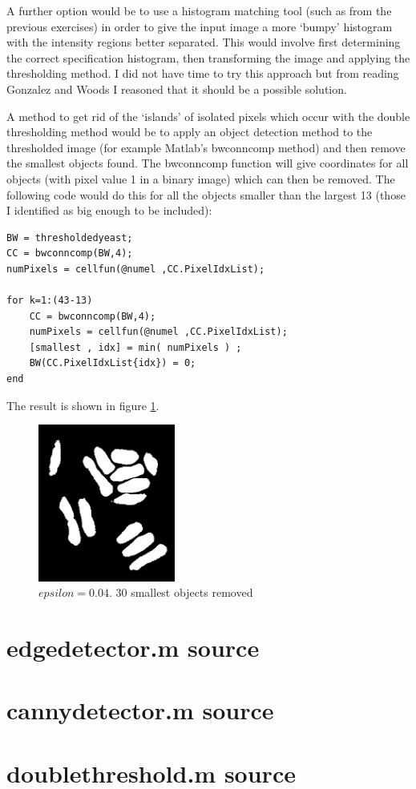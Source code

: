 \documentclass[a4paper]{article}
\begin{document}
A further option would be to use a histogram matching tool (such as from the previous exercises) in order to give the input image a more `bumpy' histogram with the intensity regions better separated. This would involve first determining the correct specification histogram, then transforming the image and applying the thresholding method. I did not have time to try this approach but from reading Gonzalez and Woods I reasoned that it should be a possible solution.


A method to get rid of the `islands' of isolated pixels which occur with the double thresholding method would be to apply an object detection method to the thresholded image (for example Matlab's bwconncomp method) and then remove the smallest objects found. The bwconncomp function will give coordinates for all objects (with pixel value 1 in a binary image) which can then be removed. The following code would do this for all the objects smaller than the largest 13 (those I identified as big enough to be included):
\begin{lstlisting}
BW = thresholdedyeast; 
CC = bwconncomp(BW,4);
numPixels = cellfun(@numel ,CC.PixelIdxList); 

for k=1:(43-13)
    CC = bwconncomp(BW,4);
    numPixels = cellfun(@numel ,CC.PixelIdxList); 
    [smallest , idx] = min( numPixels ) ; 
    BW(CC.PixelIdxList{idx}) = 0;
end
\end{lstlisting}
The result is shown in figure \ref{fig:6d}.
\begin{figure}
   
            \centering
            \includegraphics[width=0.4\textwidth]{q3-yeast-smallremoved-004.png}
            \caption{$epsilon=0.04$. 30 smallest objects removed}
            \label{fig:6d}
                
    
    \end{figure}
\clearpage
\appendix 
\section{edgedetector.m source} 
\label{appendix-edgedetector} 

\section{cannydetector.m source} 
\label{appendix-cannydetector} 


\section{doublethreshold.m source} 
\label{appendix-doublethreshold} 

\end{document}
